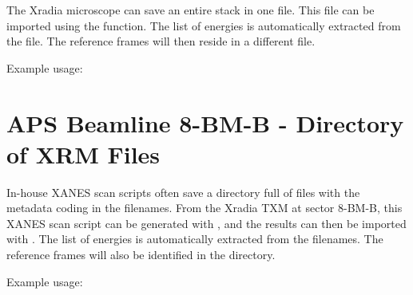 \documentclass[letterpaper,10pt,english]{sphinxmanual}
\begin{document}
The Xradia microscope can save an entire stack in one 
file. This file can be imported using the
{\hyperref[\detokenize{xanespy:xanespy.importers.import_aps_8BM_xanes_file}]{}} function. The
list of energies is automatically extracted from the file. The
reference frames will then reside in a different  file.

Example usage:

\begin{sphinxVerbatim}[commandchars=\\\{\}]
   

\end{sphinxVerbatim}


\section{APS Beamline 8-BM-B - Directory of XRM Files}
\label{\detokenize{importing:aps-beamline-8-bm-b-directory-of-xrm-files}}
In-house XANES scan scripts often save a directory full of 
files with the metadata coding in the filenames. From the Xradia TXM
at sector 8-BM-B, this XANES scan script can be generated with
{\hyperref[\detokenize{xanespy:xanespy.beamlines.sector8_xanes_script}]{}}, and the results
can then be imported with
{\hyperref[\detokenize{xanespy:xanespy.importers.import_aps_8BM_xanes_dir}]{}}. The list of
energies is automatically extracted from the filenames. The reference
frames will also be identified in the directory.

Example usage:
\end{document}
